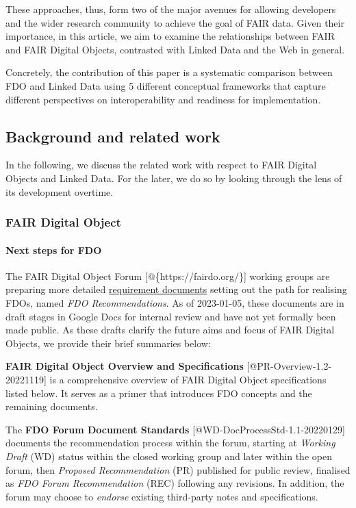 These approaches, thus, form two of the major avenues for allowing
developers and the wider research community to achieve the goal of FAIR
data. Given their importance, in this article, we aim to examine the
relationships between FAIR and FAIR Digital Objects, contrasted with
Linked Data and the Web in general.

Concretely, the contribution of this paper is a systematic comparison
between FDO and Linked Data using 5 different conceptual frameworks that
capture different perspectives on interoperability and readiness for
implementation.

\hypertarget{sec:background}{%
\subsection{Background and related work}\label{sec:background}}

In the following, we discuss the related work with respect to FAIR
Digital Objects and Linked Data. For the later, we do so by looking
through the lens of its development overtime.

\hypertarget{sec:fdo}{%
\subsubsection{FAIR Digital Object}\label{sec:fdo}}

\hypertarget{sec:next-step-fdo}{%
\paragraph{Next steps for FDO}\label{sec:next-step-fdo}}

The FAIR Digital Object Forum {[}@\{https://fairdo.org/\}{]} working
groups are preparing more detailed
\href{https://docs.google.com/spreadsheets/d/1O1PTLmVWqjQgvJsIcPgaZJe9BntHZt8_QndEG0eRwUY/edit}{requirement
documents} setting out the path for realising FDOs, named \emph{FDO
Recommendations}. As of 2023-01-05, these documents are in draft stages
in Google Docs for internal review and have not yet formally been made
public. As these drafts clarify the future aims and focus of FAIR
Digital Objects, we provide their brief summaries below:

\textbf{FAIR Digital Object Overview and Specifications}
{[}@PR-Overview-1.2-20221119{]} is a comprehensive overview of FAIR
Digital Object specifications listed below. It serves as a primer that
introduces FDO concepts and the remaining documents.

The \textbf{FDO Forum Document Standards}
{[}@WD-DocProcessStd-1.1-20220129{]} documents the recommendation
process within the forum, starting at \emph{Working Draft} (WD) status
within the closed working group and later within the open forum, then
\emph{Proposed Recommendation} (PR) published for public review,
finalised as \emph{FDO Forum Recommendation} (REC) following any
revisions. In addition, the forum may choose to \emph{endorse} existing
third-party notes and specifications.


